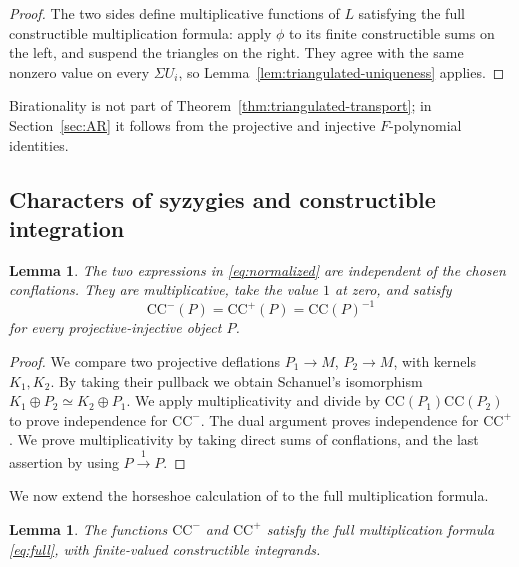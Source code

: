 \documentclass[11pt]{amsart}
\numberwithin{equation}{section}
\newtheorem{lemma}[theorem]{Lemma}
\theoremstyle{definition}
\theoremstyle{remark}
\newcommand{\CC}{\mathrm{CC}}
\begin{document}
\begin{proof}
The two sides define multiplicative functions of $L$ satisfying the full
constructible multiplication formula: apply $\phi$ to its finite
constructible sums on the left, and suspend the triangles on the right.
They agree with the same nonzero value on every $\Sigma U_i$, so
Lemma~\ref{lem:triangulated-uniqueness} applies.
\end{proof}

Birationality is not part of Theorem~\ref{thm:triangulated-transport};
in Section~\ref{sec:AR} it follows from the projective and injective
$F$-polynomial identities.

\subsection{Characters of syzygies and constructible integration}\label{sec:full-syzygy}

\begin{lemma}\label{lem:schange}
The two expressions in \eqref{eq:normalized} are independent of the
chosen conflations. They are multiplicative, take the value $1$ at
zero, and satisfy
\[ \CC^-(P)=\CC^+(P)=\CC(P)^{-1} \]
for every projective-injective object $P$.
\end{lemma}

\begin{proof}
We compare two projective deflations $P_1\to M$, $P_2\to M$, with
kernels $K_1,K_2$. By taking their pullback we obtain Schanuel's
isomorphism $K_1\oplus P_2\simeq K_2\oplus P_1$.
We apply multiplicativity and divide by $\CC(P_1)\CC(P_2)$ to prove
independence for $\CC^-$. The dual argument proves independence for
$\CC^+$. We prove multiplicativity by taking direct sums of
conflations, and the last assertion by using $P\xrightarrow{1}P$.
\end{proof}

We now extend the horseshoe calculation of
\cite[proof of Theorem~5.27]{Pre} to the full multiplication formula.

\begin{lemma}\label{lem:horseshoe}
The functions $\CC^-$ and $\CC^+$ satisfy the full multiplication
formula \eqref{eq:full}, with finite-valued constructible integrands.
\end{lemma}
\end{document}
